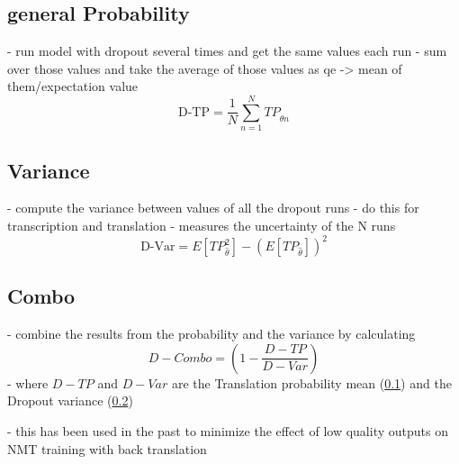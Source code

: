 \subsection{general Probability}
\label{dropoutprob}
- run model with dropout several times and get the same values each run 
- sum over those values and take the average of those values as qe -> mean of them/expectation value
$$\text{D-TP}=\frac{1}{N}\sum_{n=1}^N TP_{\hat\theta n}\label{formula:dropoutprobability}$$


\subsection{Variance}
\label{dropoutvar}
- compute the variance between values of all the dropout runs 
- do this for transcription and translation 
- measures the uncertainty of the N runs 
$$\text{D-Var}=E[TP_{\hat\theta}^2]-(E[TP_{\hat\theta}])^2\label{formula:dropoutvariance}$$

\subsection{Combo}
- combine the results from the probability and the variance by calculating $$D-Combo=(1-\frac{D-TP}{D-Var})\label{formula:Dropoutcombo}$$
- where $D-TP$ and $D-Var$ are the Translation probability mean (\ref{dropoutprob}) and the Dropout variance (\ref{dropoutvar})

- this has been used in the past to minimize the effect of low quality outputs on NMT training with back translation \cite{wang-etal-2018-alibaba} 


